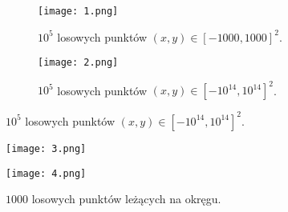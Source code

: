\begin{figure}[h]
    \centering
    \begin{subfigure}{.5\textwidth}
      \centering
      \texttt{[image: 1.png]}
      \caption{$10^5$ losowych punktów $(x, y) \in \left[-1000,1000\right]^{2}$.}
      \label{fig:sub1}
    \end{subfigure}%
    \begin{subfigure}{.5\textwidth}
      \centering
      \texttt{[image: 2.png]}
      \caption{$10^5$ losowych punktów $(x, y) \in \left[-10^{14},10^{14}\right]^{2}$.}
      \label{fig:sub2}
    \end{subfigure}
    \label{fig:test}
    \end{figure}
    
    \begin{figure}[h]
    \centering
    \begin{minipage}{.5\textwidth}
      \centering
      \texttt{[image: 3.png]}
      \caption{$1000$ losowych punktów leżących na okręgu.}
      \label{fig:test1}
    \end{minipage}%
    \begin{minipage}{.5\textwidth}
      \centering
      \texttt{[image: 4.png]}
      \label{fig:test2}
    \end{minipage}
    \end{figure}